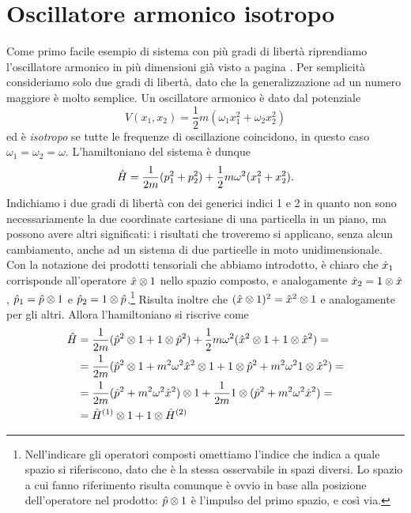 \section{Oscillatore armonico isotropo}
Come primo facile esempio di sistema con più gradi di libertà riprendiamo l'oscillatore armonico in più dimensioni già visto a pagina \pageref{sec:oscillatore-armonico-multidimensionale}.
Per semplicità consideriamo solo due gradi di libertà, dato che la generalizzazione ad un numero maggiore è molto semplice.
Un oscillatore armonico è dato dal potenziale
\begin{equation}
	V(x_1,x_2)=\frac12m(\omega_1x_1^2+\omega_2x_2^2)
\end{equation}
ed è \emph{isotropo} se tutte le frequenze di oscillazione coincidono, in questo caso $\omega_1=\omega_2=\omega$.
L'hamiltoniano del sistema è dunque
\begin{equation}
	\hat{H}=\frac1{2m}(p_1^2+p_2^2)+\frac12m\omega^2(x_1^2+x_2^2).
\end{equation}
Indichiamo i due gradi di libertà con dei generici indici 1 e 2 in quanto non sono necessariamente la due coordinate cartesiane di una particella in un piano, ma possono avere altri significati: i risultati che troveremo si applicano, senza alcun cambiamento, anche ad un sistema di due particelle in moto unidimensionale.
Con la notazione dei prodotti tensoriali che abbiamo introdotto, è chiaro che $\hat{x}_1$ corrisponde all'operatore $\hat{x}\otimes 1$ nello spazio composto, e analogamente $\hat{x}_2=1\otimes\hat{x}$, $\hat{p}_1=\hat{p}\otimes 1$ e $\hat{p}_2=1\otimes\hat{p}$.\footnote{
	Nell'indicare gli operatori composti omettiamo l'indice che indica a quale spazio si riferiscono, dato che è la stessa osservabile in spazi diversi.
	Lo spazio a cui fanno riferimento risulta comunque è ovvio in base alla posizione dell'operatore nel prodotto: $\hat{p}\otimes 1$ è l'impulso del primo spazio, e cos\`i via.
}
Risulta inoltre che $(\hat{x}\otimes 1)^2=\hat{x}^2\otimes 1$ e analogamente per gli altri.
Allora l'hamiltoniano si riscrive come
\begin{equation}
	\begin{split}
		\hat{H}&=\frac1{2m}(\hat{p}^2\otimes 1+1\otimes\hat{p}^2)+\frac12m\omega^2(\hat{x}^2\otimes 1+1\otimes\hat{x}^2)=\\
		&=\frac1{2m}(\hat{p}^2\otimes 1+m^2\omega^2\hat{x}^2\otimes 1+1\otimes\hat{p}^2+m^2\omega^2 1\otimes\hat{x}^2)=\\
		&=\frac1{2m}(\hat{p}^2+m^2\omega^2\hat{x}^2)\otimes 1+\frac1{2m}1\otimes(\hat{p}^2+m^2\omega^2\hat{x}^2)=\\
		&=\hat{H}^{(1)}\otimes 1+1\otimes\hat{H}^{(2)}
	\end{split}
\end{equation}
